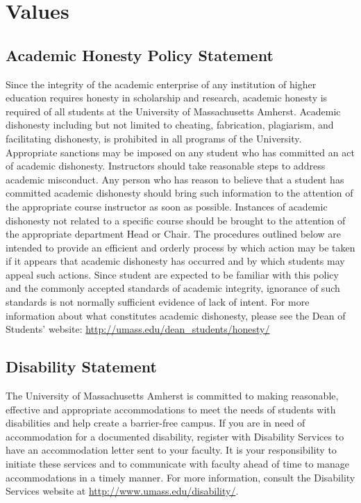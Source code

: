 \documentclass[11pt,twoside]{article}
\numberwithin{equation}{section}
\newcommand{\?}{\stackrel{?}{=}}
\begin{document}
\eject
\section{Values}
\subsection{Academic Honesty Policy Statement}
Since the integrity of the academic enterprise of any institution of higher education requires
honesty in scholarship and research, academic honesty is required of all students at the
University of Massachusetts Amherst. Academic dishonesty including but not limited to
cheating, fabrication, plagiarism, and facilitating dishonesty, is prohibited in all programs of
the University. Appropriate sanctions may be imposed on any student who has committed
an act of academic dishonesty. Instructors should take reasonable steps to address academic
misconduct. Any person who has reason to believe that a student has committed academic
dishonesty should bring such information to the attention of the appropriate course
instructor as soon as possible. Instances of academic dishonesty not related to a specific
course should be brought to the attention of the appropriate department Head or Chair. The
procedures outlined below are intended to provide an efficient and orderly process by which
action may be taken if it appears that academic dishonesty has occurred and by which
students may appeal such actions. Since student are expected to be familiar with this policy
and the commonly accepted standards of academic integrity, ignorance of such standards is
not normally sufficient evidence of lack of intent.
For more information about what constitutes academic dishonesty, please see the Dean of
Students' website: \url{http://umass.edu/dean_students/honesty/}

\subsection{Disability Statement}
The University of Massachusetts Amherst is committed to making reasonable, effective and
appropriate accommodations to meet the needs of students with disabilities and help create a
barrier-free campus. If you are in need of accommodation for a documented disability,
register with Disability Services to have an accommodation letter sent to your faculty. It is
your responsibility to initiate these services and to communicate with faculty ahead of time
to manage accommodations in a timely manner. For more information, consult the
Disability Services website at \url{http://www.umass.edu/disability/}.
\end{document}
